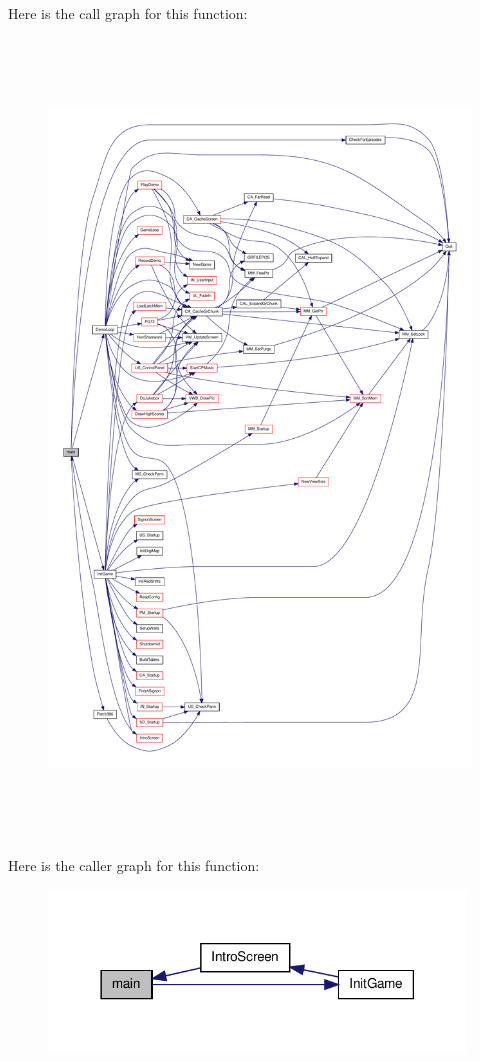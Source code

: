 Here is the call graph for this function:
\nopagebreak
\begin{figure}[H]
\begin{center}
\leavevmode
\includegraphics[height=600pt]{WL__MAIN_8C_a6288eba0f8e8ad3ab1544ad731eb7667_cgraph}
\end{center}
\end{figure}




Here is the caller graph for this function:
\nopagebreak
\begin{figure}[H]
\begin{center}
\leavevmode
\includegraphics[width=314pt]{WL__MAIN_8C_a6288eba0f8e8ad3ab1544ad731eb7667_icgraph}
\end{center}
\end{figure}


